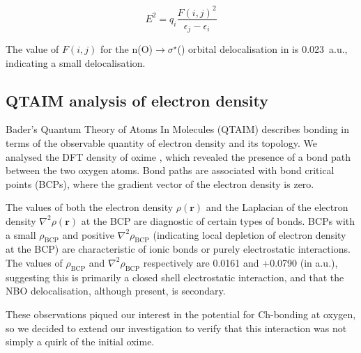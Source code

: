 \begin{refsection}
\begin{equation}
	E^2 = q_i \frac{F{(i,j)}^2}{\epsilon_j - \epsilon_i}
	\label{eqn:fock}
\end{equation}

The value of $F(i,j)$ for the n(O)$\rightarrow \sigma^{\star}$() orbital delocalisation in  is 0.023~a.u., indicating a small delocalisation.

\subsection{QTAIM analysis of electron density}
Bader's Quantum Theory of Atoms In Molecules (QTAIM) describes bonding in terms of the observable quantity of electron density and its topology.
We analysed the DFT density of oxime , which revealed the presence of a bond path between the two oxygen atoms.
Bond paths are associated with bond critical points (BCPs), where the gradient vector of the electron density is zero.

The values of both the electron density $\rho(\mathbf{r})$ and the Laplacian of the electron density $\nabla^{2}\rho(\mathbf{r})$ at the BCP are diagnostic of certain types of bonds.
BCPs with a small $\rho_\text{BCP}$ and positive $\nabla^{2}\rho_\text{BCP}$ (indicating local depletion of electron density at the BCP) are characteristic of ionic bonds or purely electrostatic interactions.
The values of $\rho_\text{BCP}$ and $\nabla^{2}\rho_\text{BCP}$ respectively are 0.0161 and +0.0790 (in a.u.), suggesting this is primarily a closed shell electrostatic interaction, and that the NBO delocalisation, although present, is secondary.

These observations piqued our interest in the potential for Ch-bonding at oxygen, so we decided to extend our investigation to verify that this interaction was not simply a quirk of the initial oxime.


\end{refsection}
